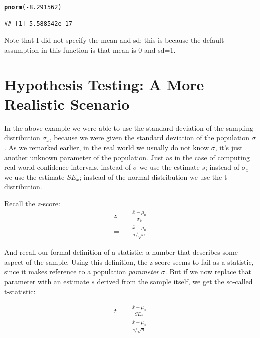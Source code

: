 \documentclass[12pt]{book}\usepackage[]{graphicx}\usepackage[]{color}
\makeatletter
\newcommand{\hlnum}[1]{\textcolor[rgb]{0.686,0.059,0.569}{#1}}%
\newcommand{\hlopt}[1]{\textcolor[rgb]{0,0,0}{#1}}%
\newcommand{\hlstd}[1]{\textcolor[rgb]{0.345,0.345,0.345}{#1}}%
\newcommand{\hlkwd}[1]{\textcolor[rgb]{0.737,0.353,0.396}{\textbf{#1}}}%
\newenvironment{kframe}{%
 \def\at@end@of@kframe{}%
 \ifinner\ifhmode%
  \def\at@end@of@kframe{\end{minipage}}%
  \begin{minipage}{\columnwidth}%
 \fi\fi%
 \def\FrameCommand##1{\hskip\@totalleftmargin \hskip-\fboxsep
 \colorbox{shadecolor}{##1}\hskip-\fboxsep
     \hskip-\linewidth \hskip-\@totalleftmargin \hskip\columnwidth}%
 \MakeFramed {\advance\hsize-\width
   \@totalleftmargin\z@ \linewidth\hsize
   \@setminipage}}%
 {\par\unskip\endMakeFramed%
 \at@end@of@kframe}
\newenvironment{knitrout}{}{} %
\makeatother
\begin{document}
\begin{knitrout}
\color{fgcolor}\begin{kframe}
\begin{alltt}
\hlkwd{pnorm}\hlstd{(}\hlopt{-}\hlnum{8.291562}\hlstd{)}
\end{alltt}
\begin{verbatim}
## [1] 5.588542e-17
\end{verbatim}
\end{kframe}
\end{knitrout}

Note that I did not specify the mean and sd; this is because the default assumption in this function is that mean is 0 and sd=1.

\section{Hypothesis Testing: A More Realistic Scenario}

In the above example we were able to use the standard deviation of the sampling distribution $\sigma_{\bar{x}}$, because we were given the standard deviation of the population
$\sigma$. As we remarked earlier, in the real world we usually do not know $\sigma$, it's just another unknown parameter of the population. Just as in the case of computing real world confidence intervals, instead of
$\sigma$ we use the estimate $s$; instead of
$\sigma_{\bar{x}}$ we use the estimate $SE_{\bar{x}}$;
instead of the normal distribution we use the t-distribution.

Recall the $z$-score:
\begin{align}
z = & \frac{\bar{x} - \mu_0}{\sigma_{\bar{x}}} \\ 
  = & \frac{\bar{x} - \mu_0}{\sigma/\sqrt{n}} 
\end{align}

And recall our formal definition of a statistic: a number that describes some aspect of the sample. Using this definition, the z-score seems to fail as a statistic, since it makes reference to a population \emph{parameter} $\sigma$. 
But if we now replace that parameter with an estimate $s$ derived from the sample itself, we get the so-called t-statistic:

\begin{align} \label{ttestequation}
t = & \frac{\bar{x} - \mu_0}{SE_{\bar{x}}} \\ 
  = & \frac{\bar{x} - \mu_0}{s/\sqrt{n}} 
\end{align}
\end{document}
